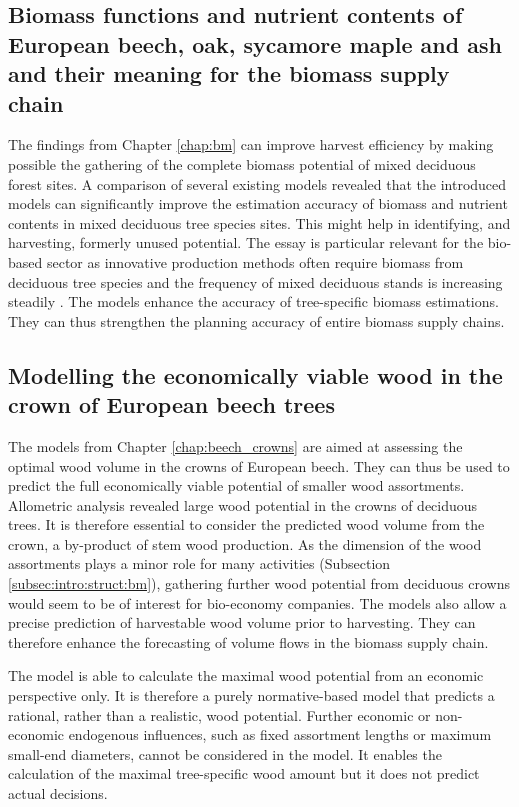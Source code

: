 \subsection{Biomass functions and nutrient contents of European beech, oak, sycamore maple and ash and their meaning for the biomass supply chain}
\label{subsec:discussion:struct:bm}
The findings from Chapter \ref{chap:bm} can improve harvest efficiency by making possible the gathering of the complete biomass potential of mixed deciduous forest sites. A comparison of several existing models revealed that the introduced models can significantly improve the estimation accuracy of biomass and nutrient contents in mixed deciduous tree species sites. This might help in identifying, and harvesting, formerly unused potential. The essay is particular relevant for the bio-based sector as innovative production methods often require biomass from deciduous tree species \citep[p. 1]{auer_2016} and the frequency of mixed deciduous stands is increasing steadily \citep{ti_2014}. The models enhance the accuracy of tree-specific biomass estimations. They can thus strengthen the planning accuracy of entire biomass supply chains.

\subsection{Modelling the economically viable wood in the crown of European beech trees}
\label{subsec:discussion:struct:beech_crowns}
The models from Chapter \ref{chap:beech_crowns} are aimed at assessing the optimal wood volume in the crowns of European beech. They can thus be used to predict the full economically viable potential of smaller wood assortments. Allometric analysis revealed large wood potential in the crowns of deciduous trees. It is therefore essential to consider the predicted wood volume from the crown, a by-product of stem wood production. As the dimension of the wood assortments plays a minor role for many activities (Subsection \ref{subsec:intro:struct:bm}), gathering further wood potential from deciduous crowns would seem to be of interest for bio-economy companies. The models also allow a precise prediction of harvestable wood volume prior to harvesting. They can therefore enhance the forecasting of volume flows in the biomass supply chain.

The model is able to calculate the maximal wood potential from an economic perspective only. It is therefore a purely normative-based model that predicts a rational, rather than a realistic, wood potential. Further economic or non-economic endogenous influences, such as fixed assortment lengths or maximum small-end diameters, cannot be considered in the model. It enables the calculation of the maximal tree-specific wood amount but it does not predict actual decisions.

